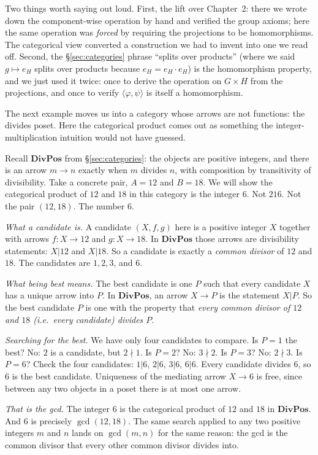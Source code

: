 \noindent Two things worth saying out loud. First, the lift over
Chapter~2: there we wrote down the component-wise operation by hand
and verified the group axioms; here the same operation was
\textit{forced} by requiring the projections to be homomorphisms. The
categorical view converted a construction we had to invent into one
we read off. Second, the \S\ref{sec:categories} phrase ``splits over
products'' (where we said $g \mapsto e_H$ splits over products because
$e_H = e_H \cdot e_H$) is the homomorphism property, and we just used
it twice: once to derive the operation on $G \times H$ from the
projections, and once to verify $\langle \varphi, \psi \rangle$ is
itself a homomorphism.

\noindent The next example moves us into a category whose arrows are
not functions: the divides poset. Here the categorical product comes
out as something the integer-multiplication intuition would not have
guessed.

\begin{example}\label{ex:divpos-product}
Recall $\mathbf{DivPos}$ from \S\ref{sec:categories}: the objects are
positive integers, and there is an arrow $m \to n$ exactly when $m$
divides $n$, with composition by transitivity of divisibility. Take a
concrete pair, $A = 12$ and $B = 18$. We will show the categorical
product of $12$ and $18$ in this category is the integer $6$. Not
$216$. Not the pair $(12, 18)$. The number $6$.

\textit{What a candidate is.} A candidate $(X, f, g)$ here is a
positive integer $X$ together with arrows $f : X \to 12$ and
$g : X \to 18$. In $\mathbf{DivPos}$ those arrows are divisibility
statements: $X | 12$ and $X | 18$. So a candidate is exactly a
\textit{common divisor} of $12$ and $18$. The candidates are
$1, 2, 3$, and $6$.

\textit{What being best means.} The best candidate is one $P$ such
that every candidate $X$ has a unique arrow into $P$. In
$\mathbf{DivPos}$, an arrow $X \to P$ is the statement $X | P$. So
the best candidate $P$ is one with the property that \textit{every
common divisor of $12$ and $18$ (i.e.\ every candidate) divides
$P$}.

\textit{Searching for the best.} We have only four candidates to
compare. Is $P = 1$ the best? No: $2$ is a candidate, but
$2 \nmid 1$. Is $P = 2$? No: $3 \nmid 2$. Is $P = 3$? No:
$2 \nmid 3$. Is $P = 6$? Check the four candidates: $1 | 6$,
$2 | 6$, $3 | 6$, $6 | 6$. Every candidate divides $6$, so $6$ is
the best candidate. Uniqueness of the mediating arrow $X \to 6$ is
free, since between any two objects in a poset there is at most one
arrow.

\textit{That is the gcd.} The integer $6$ is the categorical product
of $12$ and $18$ in $\mathbf{DivPos}$. And $6$ is precisely
$\gcd(12, 18)$. The same search applied to any two positive integers
$m$ and $n$ lands on $\gcd(m, n)$ for the same reason: the gcd is
the common divisor that every other common divisor divides into.
\end{example}

